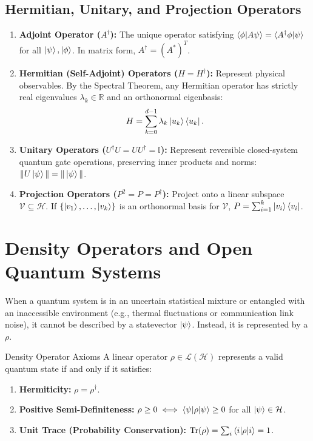 \subsection{Hermitian, Unitary, and Projection Operators}
\begin{enumerate}
    \item \textbf{Adjoint Operator ($A^\dagger$):} The unique operator satisfying $\braket{\phi|A\psi} = \braket{A^\dagger \phi|\psi}$ for all $\ket{\psi}, \ket{\phi}$. In matrix form, $A^\dagger = (A^*)^T$.
    \item \textbf{Hermitian (Self-Adjoint) Operators ($H = H^\dagger$):} Represent physical observables. By the Spectral Theorem, any Hermitian operator has strictly real eigenvalues $\lambda_k \in \mathbb{R}$ and an orthonormal eigenbasis:
    \begin{equation}
        H = \sum_{k=0}^{d-1} \lambda_k \ket{u_k}\bra{u_k}.
    \end{equation}
    \item \textbf{Unitary Operators ($U^\dagger U = U U^\dagger = \mathbb{I}$):} Represent reversible closed-system quantum gate operations, preserving inner products and norms: $\|U\ket{\psi}\| = \|\ket{\psi}\|$.
    \item \textbf{Projection Operators ($P^2 = P = P^\dagger$):} Project onto a linear subspace $\mathcal{V} \subseteq \mathcal{H}$. If $\{\ket{v_1}, \dots, \ket{v_k}\}$ is an orthonormal basis for $\mathcal{V}$, $P = \sum_{i=1}^k \ket{v_i}\bra{v_i}$.
\end{enumerate}

\section{Density Operators and Open Quantum Systems}
\label{sec:app_density_operators}

When a quantum system is in an uncertain statistical mixture or entangled with an inaccessible environment (e.g., thermal fluctuations or communication link noise), it cannot be described by a statevector $\ket{\psi}$. Instead, it is represented by a  $\rho$.

\begin{definitionbox}{Density Operator Axioms}
A linear operator $\rho \in \mathcal{L}(\mathcal{H})$ represents a valid quantum state if and only if it satisfies:
\begin{enumerate}
    \item \textbf{Hermiticity:} $\rho = \rho^\dagger$.
    \item \textbf{Positive Semi-Definiteness:} $\rho \ge 0 \iff \braket{\psi|\rho|\psi} \ge 0$ for all $\ket{\psi} \in \mathcal{H}$.
    \item \textbf{Unit Trace (Probability Conservation):} $\text{Tr}(\rho) = \sum_i \braket{i|\rho|i} = 1$.
\end{enumerate}
\end{definitionbox}

